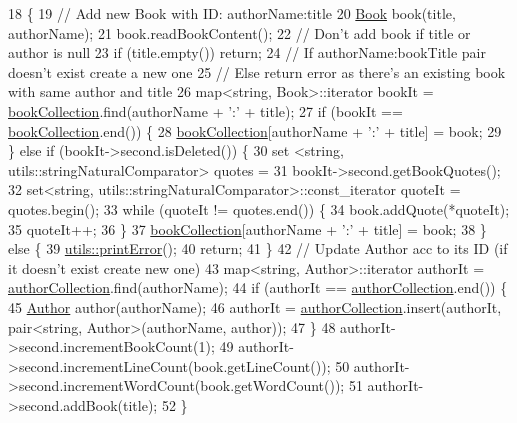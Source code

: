\begin{DoxyCode}
18                                                       \{
19     \textcolor{comment}{// Add new Book with ID: authorName:title}
20     \hyperlink{class_book}{Book} book(title, authorName);
21     book.readBookContent();
22     \textcolor{comment}{// Don't add book if title or author is null}
23     \textcolor{keywordflow}{if} (title.empty()) \textcolor{keywordflow}{return};
24     \textcolor{comment}{// If authorName:bookTitle pair doesn't exist create a new one}
25     \textcolor{comment}{// Else return error as there's an existing book with same author and title}
26     map<string, Book>::iterator bookIt = \hyperlink{class_library_a5807d6d006ac0aa0a184831f0f2e5415}{bookCollection}.find(authorName + \textcolor{charliteral}{':'} + title);
27     \textcolor{keywordflow}{if} (bookIt == \hyperlink{class_library_a5807d6d006ac0aa0a184831f0f2e5415}{bookCollection}.end()) \{
28         \hyperlink{class_library_a5807d6d006ac0aa0a184831f0f2e5415}{bookCollection}[authorName + \textcolor{charliteral}{':'} + title] = book;
29     \} \textcolor{keywordflow}{else} \textcolor{keywordflow}{if} (bookIt->second.isDeleted()) \{
30         set <string, utils::stringNaturalComparator> quotes =
31                 bookIt->second.getBookQuotes();
32         set<string, utils::stringNaturalComparator>::const\_iterator quoteIt = quotes.begin();
33         \textcolor{keywordflow}{while} (quoteIt != quotes.end()) \{
34             book.addQuote(*quoteIt);
35             quoteIt++;
36         \}
37         \hyperlink{class_library_a5807d6d006ac0aa0a184831f0f2e5415}{bookCollection}[authorName + \textcolor{charliteral}{':'} + title] = book;
38     \} \textcolor{keywordflow}{else} \{
39         \hyperlink{namespaceutils_afd76dd21b41c50ce7396e30fb5d8d75b}{utils::printError}();
40         \textcolor{keywordflow}{return};
41     \}
42     \textcolor{comment}{// Update Author acc to its ID (if it doesn't exist create new one)}
43     map<string, Author>::iterator authorIt = \hyperlink{class_library_a7a6958a0dc85a1c816ca35727306cd62}{authorCollection}.find(authorName);
44     \textcolor{keywordflow}{if} (authorIt == \hyperlink{class_library_a7a6958a0dc85a1c816ca35727306cd62}{authorCollection}.end()) \{
45         \hyperlink{class_author}{Author} author(authorName);
46         authorIt = \hyperlink{class_library_a7a6958a0dc85a1c816ca35727306cd62}{authorCollection}.insert(authorIt, pair<string, Author>(authorName, 
      author));
47     \}
48     authorIt->second.incrementBookCount(1);
49     authorIt->second.incrementLineCount(book.getLineCount());
50     authorIt->second.incrementWordCount(book.getWordCount());
51     authorIt->second.addBook(title);
52 \}
\end{DoxyCode}
